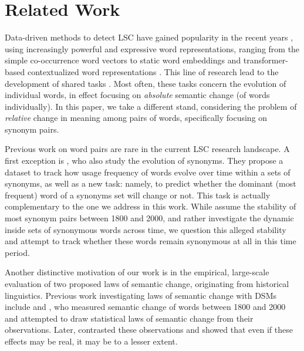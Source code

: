 \documentclass[11pt]{article}
\begin{document}
\section{Related Work}

Data-driven methods to detect LSC have gained popularity in the recent years \cite{tahmasebi-etal-2021-survey}, using increasingly powerful and expressive word representations, ranging from the simple co-occurrence word vectors \citep{sagi-etal-2011} to static word embeddings \citep{schlechtweg-etal-2019-wind} and transformer-based contextualized word representations \citep{kutuzov-2022-contextualized,fourrier-montariol-2022-caveats}. This line of research lead to the development of shared tasks \citep{d-zamora-reina-etal-2022-black, schlechtweg-etal-2020-semeval, rodina-kutuzov-2020-rusemshift}. Most often, these tasks concern the evolution of individual words, in effect focusing on \textit{absolute} semantic change (of words individually). In this paper, we take a different stand, considering the problem of \textit{relative} change in meaning among pairs of words, specifically focusing on synonym pairs.

Previous work on word pairs are rare in the current LSC research landscape. A first exception is \cite{turney-etal-2019-natural-selection}, who also study the evolution of synonyms. They propose a dataset to track how usage frequency of words evolve over time within a sets of synonyms, as well as a new task: namely, to predict whether the dominant (most frequent) word of a synonyms set will change or not. This task is actually complementary to the one we address in this work. While \citet{turney-etal-2019-natural-selection} assume the stability of most synonym pairs between 1800 and 2000, and rather investigate the dynamic inside sets of synonymous words across time, we question this alleged stability and attempt to track whether these words remain synonymous at all in this time period.


Another distinctive motivation of our work is in the empirical, large-scale evaluation of two proposed laws of semantic change, originating from historical linguistics. Previous work investigating laws of semantic change with DSMs include \citet{dubossarsky-etal-2015-bottom-up} and \citet{hamilton-etal-2016-diachronic}, who measured semantic change of words between 1800 and 2000 and attempted to draw statistical laws of semantic change from their observations. Later, \citet{dubossarsky-etal-2017-outta} contrasted these observations and showed that even if these effects may be real, it may be to a lesser extent.
\end{document}
